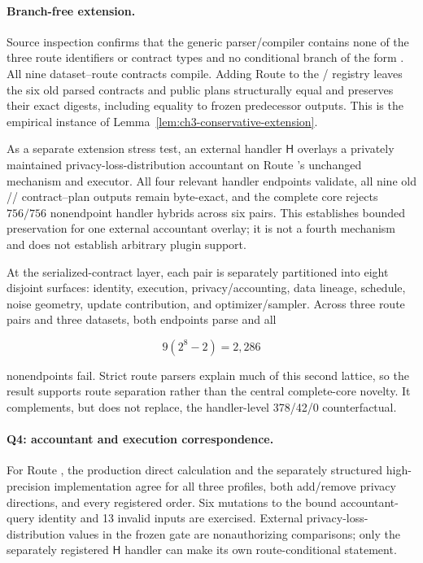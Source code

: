 \paragraph{Branch-free extension.}
Source inspection confirms that the generic parser/compiler contains none of the
three route identifiers or contract types and no conditional branch of the form
.  All nine dataset--route contracts compile.  Adding
Route \RouteA{} to the \RouteP/\RouteF{} registry leaves the six old parsed
contracts and public plans structurally equal and preserves their exact digests,
including equality to frozen predecessor outputs.  This is the empirical instance
of Lemma~\ref{lem:ch3-conservative-extension}.

As a separate extension stress test, an external handler \(\mathsf H\) overlays a
privately maintained privacy-loss-distribution accountant on Route \RouteA's
unchanged mechanism and executor.  All four relevant handler endpoints validate,
all nine old \RouteP/\RouteF/\RouteA{} contract--plan outputs remain byte-exact,
and the complete core rejects \(756/756\) nonendpoint handler hybrids across six
pairs.  This establishes bounded preservation for one external accountant overlay;
it is not a fourth mechanism and does not establish arbitrary plugin support.

At the serialized-contract layer, each pair is separately partitioned into eight
disjoint surfaces: identity, execution, privacy/accounting, data lineage, schedule,
noise geometry, update contribution, and optimizer/sampler.  Across three route
pairs and three datasets, both endpoints parse and all

\begin{equation}
    9\left(2^8-2\right)=2{,}286
\label{eq:ch3-contract-lattice}
\end{equation}

nonendpoints fail.  Strict route parsers explain much of this second lattice, so
the result supports route separation rather than the central complete-core
novelty.  It complements, but does not replace, the handler-level 378/42/0
counterfactual.

\paragraph{Q4: accountant and execution correspondence.}
For Route \RouteA, the production direct calculation and the separately structured
high-precision implementation agree for all three profiles, both add/remove
privacy directions, and every registered order.  Six mutations to the bound
accountant-query identity and 13 invalid inputs are exercised.  External
privacy-loss-distribution values in the frozen gate are nonauthorizing
comparisons; only the separately registered \(\mathsf H\) handler can make its own
route-conditional statement.

